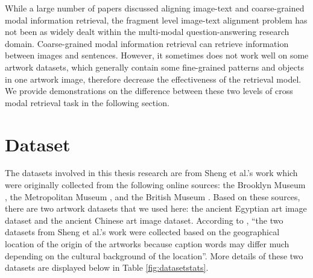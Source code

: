 While a large number of papers discussed aligning image-text and coarse-grained modal information retrieval, the fragment level image-text alignment problem has not been as widely dealt within the multi-modal question-answering research domain. Coarse-grained modal information retrieval can retrieve information between images and sentences. However, it sometimes does not work well on some artwork datasets, which generally contain some fine-grained patterns and objects in one artwork image, therefore decrease the effectiveness of the retrieval model. We provide demonstrations on the difference between these two levels of cross modal retrieval task in the following section.




\section{Dataset}

The datasets involved in this thesis research are from Sheng et al.'s work \cite{artworkcaption} which were originally collected from the following online sources: the Brooklyn Museum \cite{brooklynmuseum}, the Metropolitan Museum \cite{themet}, and the British Museum \cite{thebritishmuseum}. Based on these sources, there are two artwork datasets that we used here: the ancient Egyptian art image dataset and the ancient Chinese art image dataset. According to \cite{artworkcaption}, ``the two datasets from Sheng et al.'s work were collected based on the geographical location of the origin of the artworks because caption words may differ much depending on the cultural background of the location''. More details of these two datasets are displayed below in Table \ref{fig:datasetstats}. 

